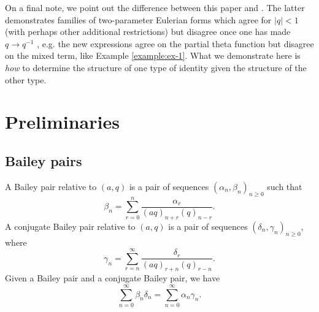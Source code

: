 \documentclass[12pt,reqno]{amsart}
\theoremstyle{remark}
\theoremstyle{definition}
\numberwithin{theorem}{section} \numberwithin{equation}{section}
\numberwithin{example}{section}
\begin{document}
On a final note, we point out the difference between this paper and \cite{BFR}.  The latter demonstrates families of two-parameter Eulerian forms which agree for $|q|<1$ (with perhaps other additional restrictions) but disagree once one has made $q\rightarrow q^{-1}$ , e.g. the new expressions agree on the partial theta function but disagree on the mixed term, like Example \ref{example:ex-1}.  What we demonstrate here is {\em how} to determine the structure of one type of identity given the structure of the other type.

\section{Preliminaries}\label{section:prelim}

\subsection{Bailey pairs}
A Bailey pair relative to $(a,q)$ is a pair of sequences $(\alpha_n,\beta_n)_{n\ge 0}$ such that
\begin{equation}
\beta_n=\sum_{r=0}^n\frac{\alpha_r}{(aq)_{n+r}(q)_{n-r}}.\label{equation:bp-def}
\end{equation}
A conjugate Bailey pair relative to $(a,q)$ is a pair of sequences  $(\delta_n,\gamma_n)_{n\ge 0}$, where
\begin{equation}
\gamma_n=\sum_{r=n}^{\infty}\frac{\delta_r}{(aq)_{r+n}(q)_{r-n}}.\label{equation:bp-conj-def}
\end{equation}
Given a Bailey pair and a conjugate Bailey pair, we have
\begin{equation}
\sum_{n=0}^{\infty}\beta_n\delta_n=\sum_{n=0}^{\infty}\alpha_n\gamma_n.\label{equation:bp-conj-id}
\end{equation}
\end{document}

